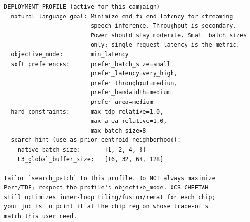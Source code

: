 \begin{tcolorbox}[
    colback=green!6, colframe=green!45!black, title=\textbf{Deployment Profile: \texttt{interactive\_speech}}, fonttitle=\bfseries, breakable, left=4pt, right=4pt, top=4pt, bottom=4pt ]
\begin{verbatim}
DEPLOYMENT PROFILE (active for this campaign)
  natural-language goal: Minimize end-to-end latency for streaming
                         speech inference. Throughput is secondary.
                         Power should stay moderate. Small batch sizes
                         only; single-request latency is the metric.
  objective_mode:        min_latency
  soft preferences:      prefer_batch_size=small,
                         prefer_latency=very_high,
                         prefer_throughput=medium,
                         prefer_bandwidth=medium,
                         prefer_area=medium
  hard constraints:      max_tdp_relative=1.0,
                         max_area_relative=1.0,
                         max_batch_size=8
  search hint (use as prior_centroid neighborhood):
    native_batch_size:       [1, 2, 4, 8]
    L3_global_buffer_size:   [16, 32, 64, 128]

Tailor `search_patch` to this profile. Do NOT always maximize
Perf/TDP; respect the profile's objective_mode. OCS-CHEETAH
still optimizes inner-loop tiling/fusion/remat for each chip;
your job is to point it at the chip region whose trade-offs
match this user need.
\end{verbatim}
\end{tcolorbox}

\bigskip

